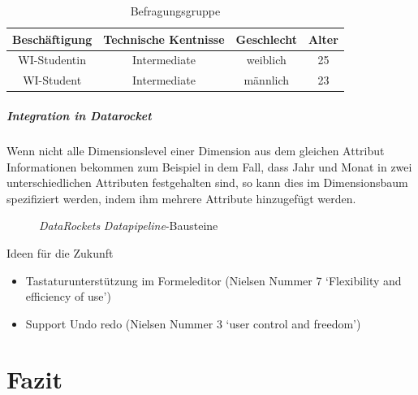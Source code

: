 \documentclass[
  language=german, %
  type=bachelor,%
  ngerman
]{isthesis}
\begin{document}
\begin{content}
  \begin{table}[]
    \footnotesize
    \begin{tabular}{c c c c}
      Beschäftigung & Technische Kentnisse & Geschlecht & Alter \\
      \toprule
      WI-Studentin & Intermediate & weiblich & 25 \\
      WI-Student & Intermediate & männlich & 23 \\
    \end{tabular}
    \caption{Befragungsgruppe}\label{table:befragungsgruppe}
  \end{table}

 \paragraph{Integration in \textit{Datarocket}}
 Wenn nicht alle Dimensionslevel einer Dimension aus dem gleichen Attribut
 Informationen bekommen zum Beispiel in dem Fall, dass Jahr und Monat in zwei
 unterschiedlichen Attributen festgehalten sind, so kann dies im Dimensionsbaum
 spezifiziert werden, indem ihm mehrere Attribute hinzugefügt werden.

  \begin{figure}
    \caption{\textit{DataRockets} \textit{Datapipeline}-Bausteine}\label{}
  \end{figure}

	Ideen für die Zukunft
	\begin{itemize}
    \item Tastaturunterstützung im Formeleditor (Nielsen Nummer 7 `Flexibility
      and efficiency of use')
    \item Support Undo redo (Nielsen Nummer 3 `user control and freedom')
	\end{itemize}

\chapter{Fazit}\label{ch:fazit}



  

\end{content}
\end{document}
